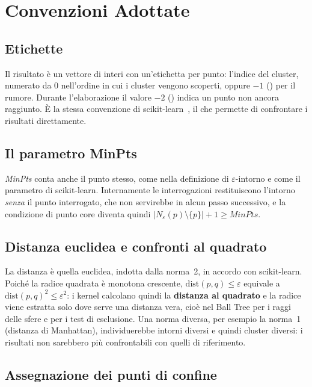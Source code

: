 \section{Convenzioni Adottate}

\subsection*{Etichette}

Il risultato è un vettore di interi con un'etichetta per punto: l'indice del cluster, numerato da 0 nell'ordine in cui i cluster vengono scoperti, oppure $-1$ () per il rumore. Durante l'elaborazione il valore $-2$ () indica un punto non ancora raggiunto. È la stessa convenzione di scikit-learn~\cite{sklearn}, il che permette di confrontare i risultati direttamente.

\subsection*{Il parametro MinPts}

\textit{MinPts} conta anche il punto stesso, come nella definizione di $\varepsilon$-intorno e come il parametro  di scikit-learn. Internamente le interrogazioni restituiscono l'intorno \emph{senza} il punto interrogato, che non servirebbe in alcun passo successivo, e la condizione di punto core diventa quindi $|N_\varepsilon(p) \setminus \{p\}| + 1 \ge \mathit{MinPts}$.

\subsection*{Distanza euclidea e confronti al quadrato}

La distanza è quella euclidea, indotta dalla norma~2, in accordo con scikit-learn. Poiché la radice quadrata è monotona crescente, $\mathrm{dist}(p,q) \le \varepsilon$ equivale a $\mathrm{dist}(p,q)^2 \le \varepsilon^2$: i kernel calcolano quindi la \textbf{distanza al quadrato} e la radice viene estratta solo dove serve una distanza vera, cioè nel Ball Tree per i raggi delle sfere e per i test di esclusione. Una norma diversa, per esempio la norma~1 (distanza di Manhattan), individuerebbe intorni diversi e quindi cluster diversi: i risultati non sarebbero più confrontabili con quelli di riferimento.

\subsection*{Assegnazione dei punti di confine}

